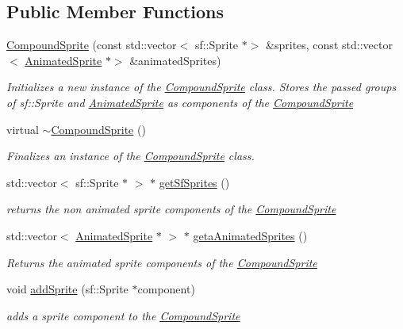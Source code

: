 \subsection*{Public Member Functions}
\begin{DoxyCompactItemize}
\item 
\hyperlink{class_compound_sprite_ae9cc3d47da7d32e94b4c96c1ca55322c}{Compound\+Sprite} (const std\+::vector$<$ sf\+::\+Sprite $\ast$$>$ \&sprites, const std\+::vector$<$ \hyperlink{class_animated_sprite}{Animated\+Sprite} $\ast$$>$ \&animated\+Sprites)
\begin{DoxyCompactList}\small\item\em Initializes a new instance of the \hyperlink{class_compound_sprite}{Compound\+Sprite} class. Stores the passed groups of sf\+::\+Sprite and \hyperlink{class_animated_sprite}{Animated\+Sprite} as components of the \hyperlink{class_compound_sprite}{Compound\+Sprite} \end{DoxyCompactList}\item 
virtual \hyperlink{class_compound_sprite_aca999fc5b5e8acad37303ae151ab9bd9}{$\sim$\+Compound\+Sprite} ()
\begin{DoxyCompactList}\small\item\em Finalizes an instance of the \hyperlink{class_compound_sprite}{Compound\+Sprite} class. \end{DoxyCompactList}\item 
std\+::vector$<$ sf\+::\+Sprite $\ast$ $>$ $\ast$ \hyperlink{class_compound_sprite_ad52cfe65b36ff363698377b115c142e1}{get\+Sf\+Sprites} ()
\begin{DoxyCompactList}\small\item\em returns the non animated sprite components of the \hyperlink{class_compound_sprite}{Compound\+Sprite} \end{DoxyCompactList}\item 
std\+::vector$<$ \hyperlink{class_animated_sprite}{Animated\+Sprite} $\ast$ $>$ $\ast$ \hyperlink{class_compound_sprite_ab5cb16c085981288f84322716a7b9329}{geta\+Animated\+Sprites} ()
\begin{DoxyCompactList}\small\item\em Returns the animated sprite components of the \hyperlink{class_compound_sprite}{Compound\+Sprite} \end{DoxyCompactList}\item 
void \hyperlink{class_compound_sprite_a13acfc8b235bdcc0a44872476042e70d}{add\+Sprite} (sf\+::\+Sprite $\ast$component)
\begin{DoxyCompactList}\small\item\em adds a sprite component to the \hyperlink{class_compound_sprite}{Compound\+Sprite} \end{DoxyCompactList}\item 

\end{DoxyCompactItemize}
